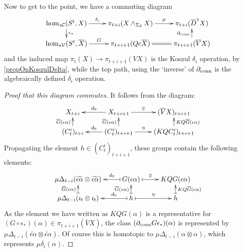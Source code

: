 \documentclass[10pt]{article}
\newcommand{\Comm}{\calC}
\begin{document}
\begin{Adams Muliplicativity}
Now to get to the point, we have a commuting diagram
\[\xymatrix@R=4mm{
\hom_{s\Comm}(S^t,X)\ar[r]^-{\delta_i}
\ar[d]^-{\epsilon_*}
&%
\pi_{t+i}(X\wedge_{\Sigma_2} X)\ar[r]^-{\mu}
&
\pi_{t+i}(\overline{D}^1X)
\\%
\hom_{s\calV}(S^t,\overline{X})\ar[r]^-{G}&%
\pi_{t+i+1}(Qc\overline{X})\ar@{=}[r]
&
\pi_{t+i+1}(\overline{V}X)
\ar[u]^-{\partial_\textup{conn}}
}\]
and the induced map $\pi_t(X)\to \pi_{t+i+1}(VX)$ is the Koszul $\delta_i$ operation, by \ref{propOnKoszulDelta}, while the top path, using the `inverse' of $\partial_\textup{conn}$ is the algebraically defined $\delta_i$ operation.
\begin{proof}[Proof that this diagram commutes]
It follows from the diagram:
\[\xymatrix@R=4mm{
X_{t+i}&%
X_{t+i+1}\ar[l]_-{d_0}
\ar[r]^-{\overline{v}}
&%
(\overline{V}X)_{t+i+1}\\%
(C_t^i)_{t+i}\ar[u]^-{\overline{G}(\epsilon\alpha)}
&%
(C_t^i)_{t+i+1}\ar[u]^-{\overline{G}(\epsilon\alpha)}\ar[r]^-{\eta}
\ar[l]_-{d_0}
&%
(KQC_t^i)_{t+i+1}\ar[u]_-{KQ\overline{G}(\epsilon\alpha)}%
}\]
Propagating the element $h\in (C_t^i)_{t+i+1}$, these groups contain the following elements:
\[\xymatrix@R=4mm{
\mu\Delta_{t-i}(\widetilde{\epsilon\alpha}\otimes \widetilde{\epsilon\alpha})&%
G(\epsilon\alpha)\ar@{|->}[l]_-{d_0}
\ar@{|->}[r]^-{\overline{v}}
&%
KQG(\epsilon\alpha)\\%
\mu\Delta_{t-i}(\imath_t\otimes\imath_t)\ar@{|->}[u]^-{\overline{G}(\epsilon\alpha)}
&%
h\ar@{|->}[u]^-{\overline{G}(\epsilon\alpha)}\ar@{|->}[r]^-{\eta}
\ar@{|->}[l]_-{d_0}
&%
h\ar@{|->}[u]_-{KQ\overline{G}(\epsilon\alpha)}%
}\]
As the element we have written as $KQG(\alpha)$ is a representative for $(G\circ\epsilon_*)(\alpha)\in\pi_{t+i+1}(\overline{V}X)$, the class $(\partial_\textup{conn}\circ G\circ\epsilon_*)(\alpha)$ is represented by $\mu\Delta_{t-i}(\widetilde{\epsilon\alpha}\otimes \widetilde{\epsilon\alpha})$. Of course this is homotopic to $\mu\Delta_{t-i}(\alpha\otimes \alpha)$, which represents $\mu\delta_i(\alpha)$.
\end{proof}
\end{Adams Muliplicativity}
\end{document}
